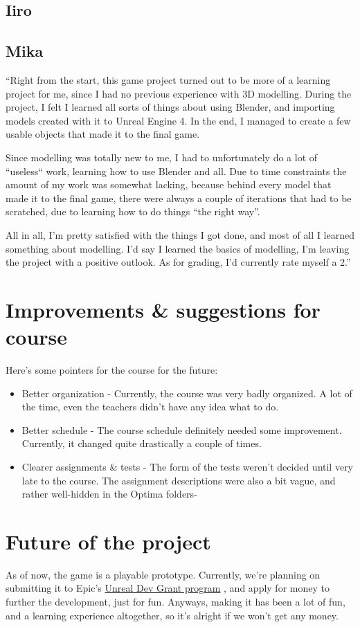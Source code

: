 \documentclass[
  oneside,
  11pt, a4paper,
  footinclude=true,
  headinclude=true,
  cleardoublepage=empty
]{scrbook}
\begin{document}
\section{Iiro}
\section{Mika}

``Right from the start, this game project turned out to be more of a learning project for me, since I had no previous experience with 3D modelling. During the project, I felt I learned all sorts of things about using Blender, and importing models created with it to Unreal Engine 4. In the end, I managed to create a few usable objects that made it to the final game.

\medskip
Since modelling was totally new to me, I had to unfortunately do a lot of “useless“ work, learning how to use Blender and all. Due to time constraints the amount of my work was somewhat lacking, because behind every model that made it to the final game, there were always a couple of iterations that had to be scratched, due to learning how to do things “the right way”.

\medskip
All in all, I’m pretty satisfied with the things I got done, and most of all I learned something about modelling. I’d say I learned the basics of modelling, I’m leaving the project with a positive outlook. As for grading, I’d currently rate myself a 2.''

\chapter{Improvements \& suggestions for course}
Here's some pointers for the course for the future:
\begin{itemize}
\item Better organization - Currently, the course was very badly organized. A lot of the time, even the teachers didn't have any idea what to do.

\item Better schedule - The course schedule definitely needed some improvement. Currently, it changed quite drastically a couple of times.

\item Clearer assignments \& tests - The form of the tests weren't decided until very late to the course. The assignment descriptions were also a bit vague, and rather well-hidden in the Optima folders-
\end{itemize}
\chapter{Future of the project}
As of now, the game is a playable prototype. Currently, we're planning on submitting it to Epic's \href{https://www.unrealengine.com/unrealdevgrants}{Unreal Dev Grant program} , and apply for money to further the development, just for fun. Anyways, making it has been a lot of fun, and a learning experience altogether, so it's alright if we won't get any money.
\end{document}
